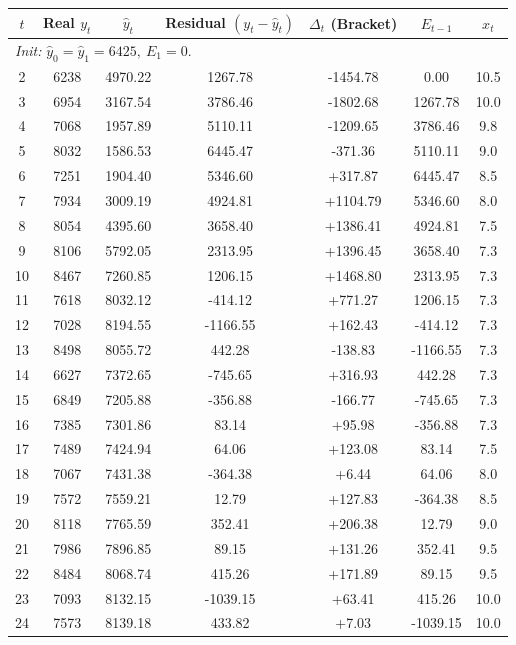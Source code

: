 \documentclass{article}
\begin{document}
\begin{enumerate}
\label{tab:euler_corr_24}
\begin{tabular}{ccccccc}
\toprule
$t$ & Real $y_t$ & $\hat{y}_t$ & Residual $(y_t-\hat{y}_t)$ & $\Delta_t$ {\footnotesize (Bracket)} & $E_{t-1}$ & $x_t$\\
\midrule
\multicolumn{7}{l}{\textit{Init: }$\hat{y}_0=\hat{y}_1=6425,\ E_1=0.$}\\
2 &6238 &4970.22 &1267.78 &-1454.78 &0.00  &10.5\\
3 &6954 &3167.54 &3786.46 &-1802.68 &1267.78 &10.0\\
4 &7068 &1957.89 &5110.11 &-1209.65 &3786.46 &9.8\\
5 &8032 &1586.53 &6445.47 &-371.36 &5110.11 &9.0\\
6 &7251 &1904.40 &5346.60 &+317.87 &6445.47 &8.5\\
7 &7934 &3009.19 &4924.81 &+1104.79 &5346.60 &8.0\\
8 &8054 &4395.60 &3658.40 &+1386.41 &4924.81 &7.5\\
9 &8106 &5792.05 &2313.95 &+1396.45 &3658.40 &7.3\\
10&8467 &7260.85 &1206.15 &+1468.80 &2313.95 &7.3\\
11&7618 &8032.12 &-414.12 &+771.27  &1206.15 &7.3\\
12&7028 &8194.55 &-1166.55 &+162.43 &-414.12 &7.3\\
13&8498 &8055.72 &442.28 &-138.83 &-1166.55 &7.3\\
14&6627 &7372.65 &-745.65 &+316.93 &442.28  &7.3\\
15&6849 &7205.88 &-356.88 &-166.77 &-745.65 &7.3\\
16&7385 &7301.86 &83.14  &+95.98   &-356.88 &7.3\\
17&7489 &7424.94 &64.06  &+123.08  &83.14   &7.5\\
18&7067 &7431.38 &-364.38 &+6.44   &64.06   &8.0\\
19&7572 &7559.21 &12.79   &+127.83 &-364.38 &8.5\\
20&8118 &7765.59 &352.41  &+206.38 &12.79   &9.0\\
21&7986 &7896.85 &89.15   &+131.26 &352.41  &9.5\\
22&8484 &8068.74 &415.26  &+171.89 &89.15   &9.5\\
23&7093 &8132.15 &-1039.15 &+63.41 &415.26  &10.0\\
24&7573 &8139.18 &433.82  &+7.03  &-1039.15 &10.0\\
\bottomrule
\end{tabular}
\


\end{enumerate}
\end{document}
